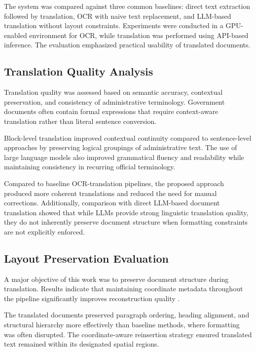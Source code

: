 \documentclass[11pt]{article}
\begin{document}
The system was compared against three common baselines: direct text extraction followed by translation, OCR with naive text replacement, and LLM-based translation without layout constraints. Experiments were conducted in a GPU-enabled environment for OCR, while translation was performed using API-based inference. The evaluation emphasized practical usability of translated documents.

\subsection{Translation Quality Analysis}

Translation quality was assessed based on semantic accuracy, contextual preservation, and consistency of administrative terminology. Government documents often contain formal expressions that require context-aware translation rather than literal sentence conversion.

Block-level translation improved contextual continuity compared to sentence-level approaches by preserving logical groupings of administrative text. The use of large language models also improved grammatical fluency and readability while maintaining consistency in recurring official terminology.

Compared to baseline OCR-translation pipelines, the proposed approach produced more coherent translations and reduced the need for manual corrections. Additionally, comparison with direct LLM-based document translation showed that while LLMs provide strong linguistic translation quality, they do not inherently preserve document structure when formatting constraints are not explicitly enforced.

\subsection{Layout Preservation Evaluation}

A major objective of this work was to preserve document structure during translation. Results indicate that maintaining coordinate metadata throughout the pipeline significantly improves reconstruction quality \cite{xu_layoutlm:_2020,xu_layoutlmv2:_2022,huang_layoutlmv3:_2022,appalaraju_docformer:_2021}.

The translated documents preserved paragraph ordering, heading alignment, and structural hierarchy more effectively than baseline methods, where formatting was often disrupted. The coordinate-aware reinsertion strategy ensured translated text remained within its designated spatial regions.
\end{document}
